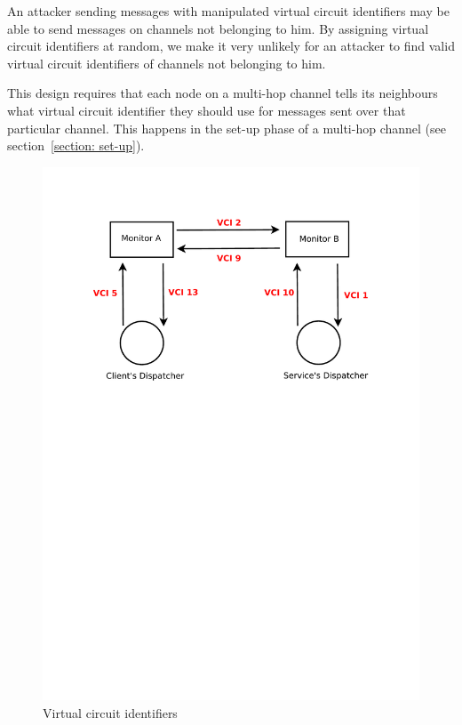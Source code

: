 \documentclass[a4paper,twoside]{report} %
\begin{document}
An attacker sending messages with manipulated virtual circuit identifiers may be able to send messages on channels not belonging to him. By assigning virtual circuit identifiers at random, we make it very unlikely for an attacker to find valid virtual circuit identifiers of channels not belonging to him.

This design requires that each node on a multi-hop channel tells its neighbours what virtual circuit identifier they should use for messages sent over that particular channel. This happens in the set-up phase of a multi-hop channel (see section~\ref{section: set-up}).

\begin{figure}[h]
	\begin{center}
 	\includegraphics[scale=0.68]{vcis.pdf}
 	\caption{Virtual circuit identifiers} \label{fig:vci}
 	\end{center}
\end{figure}
\end{document}
